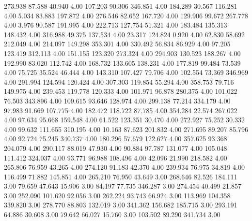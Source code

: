  273.938   87.588   40.940         4.00
 107.203   90.306  346.851         4.00
 184.289   30.567  116.281         4.00
   5.034   83.883  197.872         4.00
 276.546   82.652  167.720         4.00
 129.906   99.672  267.778         4.00
   3.976   90.587  191.995         4.00
 222.713  127.754   51.321         4.00
 183.484  135.313  148.432         4.00
 316.988   49.375  137.534         4.00
  23.317  124.824    0.920         4.00
  62.830   58.692  212.049         4.00
 214.097  149.298  353.301         4.00
 330.492   56.834   86.929         4.00
  97.205  123.419  312.113         4.00
 151.155  123.320  273.324         4.00
 294.903  130.523  188.267         4.00
 192.990   83.020  112.742         4.00
 168.732  133.605  138.231         4.00
 177.819   99.484   73.539         4.00
  75.725   35.524   46.444         4.00
 143.310  107.427   79.706         4.00
 102.554   73.369  346.969         4.00
 291.994  124.594  120.424         4.00
 307.303  119.854   55.294         4.00
 358.753   79.716  149.975         4.00
 239.453  119.778  120.333         4.00
 101.971   96.878  280.375         4.00
 101.022   76.503  343.896         4.00
 109.615   93.646  128.974         4.00
 299.138   77.214  334.179         4.00
  97.983   91.669  107.775         4.00
 182.472  118.722   87.785         4.00
 354.284   22.574  267.022         4.00
  97.634   95.668  159.548         4.00
  61.522  123.351   30.470         4.00
 272.927   75.252   30.332         4.00
  99.632  111.655  310.195         4.00
  10.163   87.623  201.832         4.00
 271.695   89.207   85.796         4.00
  92.724   75.245  340.737         4.00
 180.296   57.679  122.627         4.00
 357.625   93.368  204.079         4.00
 290.117   88.019   47.930         4.00
  90.884   97.787  131.077         4.00
 105.048  111.412  324.037         4.00
  93.771   96.988  108.496         4.00
  42.096   21.990  218.582         4.00
 265.806   76.959   43.265         4.00
 274.120   91.183   42.370         4.00
 239.934   76.975   34.819         4.00
 116.499   71.882  145.851         4.00
 265.210   76.950   43.649         3.00
 268.646   82.526  184.111         3.00
  79.659   47.643   15.906         3.00
  84.197   77.735  346.287         3.00
 274.454   40.499   21.857         3.00
 252.090  101.620   92.056         3.00
 262.224   93.743   66.924         3.00
 113.969  104.358  339.820         3.00
 278.770   88.803  132.019         3.00
 341.362  156.682  185.715         3.00
 293.191   64.886   30.608         3.00
  79.642   66.027   15.760         3.00
 103.502   89.290  341.734         3.00
